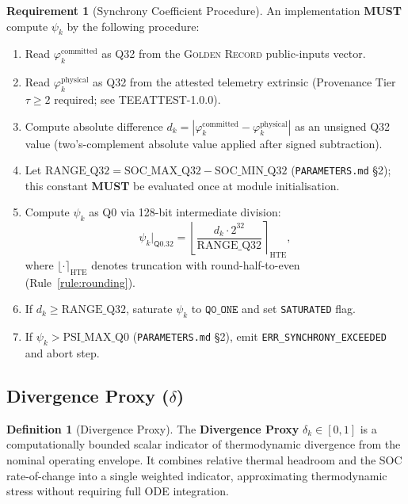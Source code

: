\documentclass[11pt,letterpaper]{article}
\theoremstyle{definition}
\newtheorem{definition}{Definition}[section]
\newtheorem{requirement}{Requirement}[section]
\newcommand{\GR}{\textsc{Golden Record}}
\newcommand{\MUST}{\textbf{MUST}}
\newcommand{\Qfmt}[2]{\ensuremath{\mathsf{Q}#1.#2}}   %
\newcommand{\qval}[1]{\ensuremath{\mathtt{#1}}}        %
\newcommand{\ph}{\varphi}       %
\newcommand{\sy}{\psi}          %
\newcommand{\dv}{\delta}        %
\begin{document}
\begin{requirement}[Synchrony Coefficient Procedure]
\label{req:psi}
An implementation \MUST{} compute $\sy_k$ by the following procedure:
\begin{enumerate}[label=\textbf{Step \arabic*.}]
    \item Read $\ph_k^{\mathrm{committed}}$ as Q32 from the \GR{} public-inputs vector.
    \item Read $\ph_k^{\mathrm{physical}}$ as Q32 from the attested telemetry extrinsic (Provenance Tier $\tau \ge 2$ required; see TEEATTEST-1.0.0).
    \item Compute absolute difference $d_k = |\ph_k^{\mathrm{committed}} - \ph_k^{\mathrm{physical}}|$ as an unsigned Q32 value (two's-complement absolute value applied after signed subtraction).
    \item Let $\mathrm{RANGE\_Q32} = \mathrm{SOC\_MAX\_Q32} - \mathrm{SOC\_MIN\_Q32}$ (\texttt{PARAMETERS.md} §2); this constant \MUST{} be evaluated once at module initialisation.
    \item Compute $\sy_k$ as Q0 via 128-bit intermediate division:
          \[
              \sy_k|_{\Qfmt{0}{32}} = \left\lfloor \frac{d_k \cdot 2^{32}}{\mathrm{RANGE\_Q32}} \right\rceil_{\mathrm{HTE}},
          \]
          where $\lfloor \cdot \rceil_{\mathrm{HTE}}$ denotes truncation with round-half-to-even (Rule~\ref{rule:rounding}).
    \item If $d_k \ge \mathrm{RANGE\_Q32}$, saturate $\sy_k$ to $\qval{Q0\_ONE}$ and set \texttt{SATURATED} flag.
    \item If $\sy_k > \mathrm{PSI\_MAX\_Q0}$ (\texttt{PARAMETERS.md} §2), emit \texttt{ERR\_SYNCHRONY\_EXCEEDED} and abort step.
\end{enumerate}
\end{requirement}

\subsection{Divergence Proxy ($\dv$)}
\label{sec:delta}

\begin{definition}[Divergence Proxy]
\label{def:delta}
The \textbf{Divergence Proxy} $\dv_k \in [0, 1]$ is a computationally bounded scalar indicator of thermodynamic divergence from the nominal operating envelope. It combines relative thermal headroom and the SOC rate-of-change into a single weighted indicator, approximating thermodynamic stress without requiring full ODE integration.
\end{definition}
\end{document}
